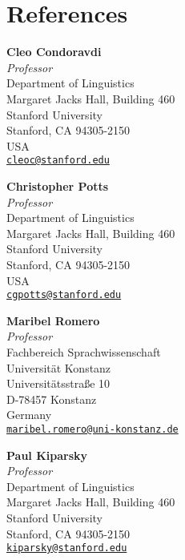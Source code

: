 \section*{References}
\begin{undated}
	\item
		\textbf{Cleo Condoravdi}\\
		\textit{Professor}\\
		Department of Linguistics\\
		Margaret Jacks Hall, Building 460\\
		Stanford University \\
		Stanford, CA 94305-2150\\
		USA\\
		\href{mailto:cleoc@stanford.edu}{\texttt{cleoc@stanford.edu}}
	\item 
		\textbf{Christopher Potts}\\
		\textit{Professor}\\
		Department of Linguistics\\
		Margaret Jacks Hall, Building 460\\
		Stanford University \\
		Stanford, CA 94305-2150\\
		USA\\
		\href{mailto:cgpotts@stanford.edu}{\texttt{cgpotts@stanford.edu}}
	\item
		\textbf{Maribel Romero}\\
		\textit{Professor}\\
		Fachbereich Sprachwissenschaft\\
		Universit\"at Konstanz\\
		Universit\"atsstra\ss{}e 10\\
		D-78457 Konstanz\\
		Germany \\
	  	\href{mailto:maribel.romero@uni-konstanz.de}{\texttt{maribel.romero@uni-konstanz.de}}
	\item 		
		\textbf{Paul Kiparsky}\\
		\textit{Professor}\\
		Department of Linguistics\\
		Margaret Jacks Hall, Building 460\\
		Stanford University \\
		Stanford, CA 94305-2150\\
		\href{mailto:kiparsky@stanford.edu}{\texttt{kiparsky@stanford.edu}}
\end{undated}